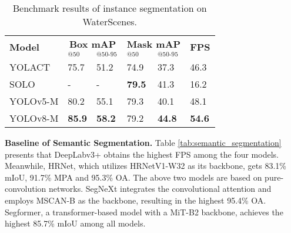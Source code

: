 \documentclass[lettersize,journal]{IEEEtran}
\begin{document}
\begin{table}[htbp]
\caption{Benchmark results of instance segmentation on WaterScenes.}
\setlength\tabcolsep{5pt} \center
\footnotesize
\begin{tabular*}{0.9\linewidth}{p{2.0cm}<{}p{0.8cm}<{\centering}p{0.8cm}<{\centering}p{0.8cm}<{\centering}p{0.8cm}<{\centering}p{0.6cm}<{\centering}}
\toprule
\multicolumn{1}{l}{\multirow{2}[2]{*}{\textbf{Model}}} &
\multicolumn{2}{c}{\bf{Box mAP}} & 
\multicolumn{2}{c}{\bf{Mask mAP}} & \multicolumn{1}{c}{\multirow{2}[2]{*}{\textbf{FPS}}}
  \\ \cmidrule(lr){2-3}\cmidrule(lr){4-5}
\multicolumn{1}{c}{} & \bf{$_{@50}$} & \bf{$_{@50\text{-}95}$} & \bf{$_{@50}$} & \bf{$_{@50\text{-}95}$} 
\\\midrule
YOLACT \cite{bolya2019yolact} & 75.7 & 51.2 & 74.9 & 37.3 & 46.3 \\
SOLO \cite{wang2020solo} & - & - & \textbf{79.5} & 41.3 & 16.2 \\
YOLOv5-M \cite{yolov8} & 80.2 & 55.1 & 79.3 & 40.1 & 48.1\\
YOLOv8-M \cite{yolov8} & \textbf{85.9} & \textbf{58.2} & 79.2 & \textbf{44.8} & \textbf{54.6}\\
\bottomrule
\end{tabular*}
\label{tab:instance-segmentation}
\end{table}

\textbf{Baseline of Semantic Segmentation.} Table \ref{tab:semantic_segmentation} presents that DeepLabv3+ obtains the highest FPS among the four models. Meanwhile, HRNet, which utilizes HRNetV1-W32 as its backbone, gets 83.1\% mIoU, 91.7\% MPA and 95.3\% OA. The above two models are based on pure-convolution networks. 
SegNeXt integrates the convolutional attention and employs MSCAN-B as the backbone, resulting in the highest 95.4\% OA. 
Segformer, a transformer-based model with a MiT-B2 backbone, achieves the highest 85.7\% mIoU among all models.
\end{document}
